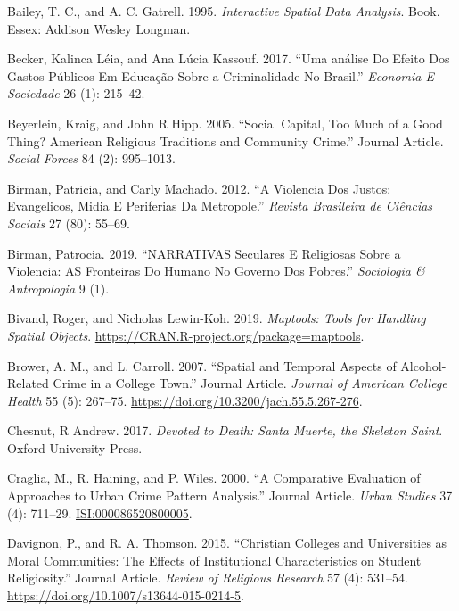 \documentclass[smallextended]{svjour3}       %
\begin{document}
\leavevmode\hypertarget{ref-Bailey1995interactive}{}%
Bailey, T. C., and A. C. Gatrell. 1995. \emph{Interactive Spatial Data
Analysis}. Book. Essex: Addison Wesley Longman.

\leavevmode\hypertarget{ref-Becker2017analise}{}%
Becker, Kalinca Léia, and Ana Lúcia Kassouf. 2017. ``Uma análise Do
Efeito Dos Gastos Públicos Em Educação Sobre a Criminalidade No
Brasil.'' \emph{Economia E Sociedade} 26 (1): 215--42.

\leavevmode\hypertarget{ref-Beyerlein2005social}{}%
Beyerlein, Kraig, and John R Hipp. 2005. ``Social Capital, Too Much of a
Good Thing? American Religious Traditions and Community Crime.'' Journal
Article. \emph{Social Forces} 84 (2): 995--1013.

\leavevmode\hypertarget{ref-Birman2012violencia}{}%
Birman, Patricia, and Carly Machado. 2012. ``A Violencia Dos Justos:
Evangelicos, Midia E Periferias Da Metropole.'' \emph{Revista Brasileira
de Ciências Sociais} 27 (80): 55--69.

\leavevmode\hypertarget{ref-Birman2019narrativas}{}%
Birman, Patrocia. 2019. ``NARRATIVAS Seculares E Religiosas Sobre a
Violencia: AS Fronteiras Do Humano No Governo Dos Pobres.''
\emph{Sociologia \& Antropologia} 9 (1).

\leavevmode\hypertarget{ref-Bivand2019maptools}{}%
Bivand, Roger, and Nicholas Lewin-Koh. 2019. \emph{Maptools: Tools for
Handling Spatial Objects}.
\url{https://CRAN.R-project.org/package=maptools}.

\leavevmode\hypertarget{ref-Brower2007spatial}{}%
Brower, A. M., and L. Carroll. 2007. ``Spatial and Temporal Aspects of
Alcohol-Related Crime in a College Town.'' Journal Article.
\emph{Journal of American College Health} 55 (5): 267--75.
\url{https://doi.org/10.3200/jach.55.5.267-276}.

\leavevmode\hypertarget{ref-Chesnut2017devoted}{}%
Chesnut, R Andrew. 2017. \emph{Devoted to Death: Santa Muerte, the
Skeleton Saint}. Oxford University Press.

\leavevmode\hypertarget{ref-Craglia2000comparative}{}%
Craglia, M., R. Haining, and P. Wiles. 2000. ``A Comparative Evaluation
of Approaches to Urban Crime Pattern Analysis.'' Journal Article.
\emph{Urban Studies} 37 (4): 711--29. \url{ISI:000086520800005}.

\leavevmode\hypertarget{ref-Davignon2015christian}{}%
Davignon, P., and R. A. Thomson. 2015. ``Christian Colleges and
Universities as Moral Communities: The Effects of Institutional
Characteristics on Student Religiosity.'' Journal Article. \emph{Review
of Religious Research} 57 (4): 531--54.
\url{https://doi.org/10.1007/s13644-015-0214-5}.
\end{document}
